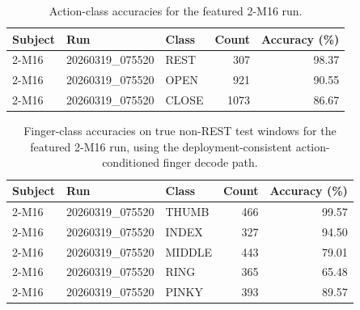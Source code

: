 \begin{table}[t]
\centering
\scriptsize
\caption{Action-class accuracies for the featured 2-M16 run.}
\label{tab:perclass-action}
\setlength{\tabcolsep}{3pt}
\begin{tabular}{lp{}lrr}
\toprule
Subject & Run & Class & Count & Accuracy (\%) \\
\midrule
2-M16 & 20260319\_\allowbreak{}075520 & REST & 307 & 98.37 \\
2-M16 & 20260319\_\allowbreak{}075520 & OPEN & 921 & 90.55 \\
2-M16 & 20260319\_\allowbreak{}075520 & CLOSE & 1073 & 86.67 \\
\bottomrule
\end{tabular}
\end{table}

\begin{table}[t]
\centering
\scriptsize
\caption{Finger-class accuracies on true non-REST test windows for the featured 2-M16 run, using the deployment-consistent action-conditioned finger decode path.}
\label{tab:perclass-finger}
\setlength{\tabcolsep}{3pt}
\begin{tabular}{lp{}lrr}
\toprule
Subject & Run & Class & Count & Accuracy (\%) \\
\midrule
2-M16 & 20260319\_\allowbreak{}075520 & THUMB & 466 & 99.57 \\
2-M16 & 20260319\_\allowbreak{}075520 & INDEX & 327 & 94.50 \\
2-M16 & 20260319\_\allowbreak{}075520 & MIDDLE & 443 & 79.01 \\
2-M16 & 20260319\_\allowbreak{}075520 & RING & 365 & 65.48 \\
2-M16 & 20260319\_\allowbreak{}075520 & PINKY & 393 & 89.57 \\
\bottomrule
\end{tabular}
\end{table}

